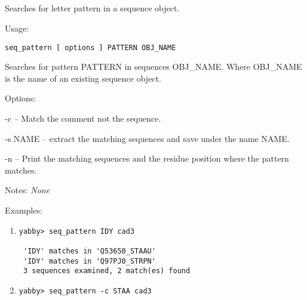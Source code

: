 

\subsection[seq\_pattern]{  }



Searches for letter pattern in a sequence object.


\begin{description}


\item{Usage:}

{\tt seq\_pattern [ options ] PATTERN OBJ\_NAME}

Searches for pattern PATTERN in sequences OBJ\_NAME.
Where OBJ\_NAME is the name of an existing sequence object.


\item{Options:}
\begin{description}
\item -c -- Match the comment not the sequence.
\item -s NAME -- extract the matching sequences and save under
    the name NAME.
\item -n -- Print the matching sequences and the residue position
    where the pattern matches.
\end{description}


\item{Notes:} {\em None}


\item{Examples:}
\begin{enumerate}

\item
\begin{verbatim}
yabby> seq_pattern IDY cad3

 'IDY' matches in 'Q53650_STAAU'
 'IDY' matches in 'Q97PJ0_STRPN'
 3 sequences examined, 2 match(es) found

\end{verbatim}

\item
\begin{verbatim}
yabby> seq_pattern -c STAA cad3


\end{verbatim}
\end{enumerate}
\end{description}
